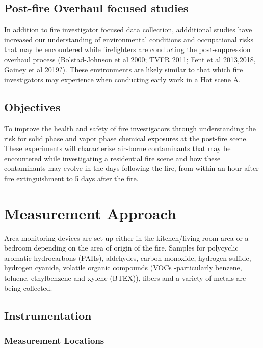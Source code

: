\documentclass[12pt,oneside]{book}
\begin{document}
\section{Post-fire Overhaul focused studies}
In addition to fire investigator focused data collection, addditional studies have increased our understanding of environmental conditions and occupational risks that may be encountered while firefighters are conducting the post-suppression overhaul process (Bolstad-Johnson et al 2000; TVFR 2011; Fent et al 2013,2018, Gainey et al 2019?). These environments are likely similar to that which fire investigators may experience when conducting early work in a Hot scene A. 



\section{Objectives}

To improve the health and safety of fire investigators through understanding the risk for solid phase and vapor phase chemical exposures at the post-fire scene.  These experiments will characterize air-borne contaminants that may be encountered while investigating a residential fire scene and how these contaminants may evolve in the days following the fire, from within an hour after fire extinguishment to 5 days after the fire.          


\chapter{Measurement Approach}

Area monitoring devices are set up either in the kitchen/living room area or a bedroom depending on the area of origin of the fire.  Samples for polycyclic aromatic hydrocarbons (PAHs), aldehydes, carbon monoxide, hydrogen sulfide, hydrogen cyanide, volatile organic compounds (VOCs -particularly benzene, toluene, ethylbenzene and xylene (BTEX)), fibers and a variety of metals are being collected.  

\section{Instrumentation}
\label{sec:instrument}

\subsection{Measurement Locations}
\label{subsec:measure_locs}
\end{document}
